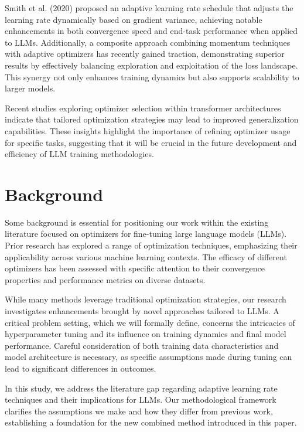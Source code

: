 \documentclass{article} %
\begin{document}
Smith et al. (2020) proposed an adaptive learning rate schedule that adjusts the learning rate dynamically based on gradient variance, achieving notable enhancements in both convergence speed and end-task performance when applied to LLMs. Additionally, a composite approach combining momentum techniques with adaptive optimizers has recently gained traction, demonstrating superior results by effectively balancing exploration and exploitation of the loss landscape. This synergy not only enhances training dynamics but also supports scalability to larger models.

Recent studies exploring optimizer selection within transformer architectures indicate that tailored optimization strategies may lead to improved generalization capabilities. These insights highlight the importance of refining optimizer usage for specific tasks, suggesting that it will be crucial in the future development and efficiency of LLM training methodologies.

\section{Background}
\label{sec:background}
Some background is essential for positioning our work within the existing literature focused on optimizers for fine-tuning large language models (LLMs). Prior research has explored a range of optimization techniques, emphasizing their applicability across various machine learning contexts. The efficacy of different optimizers has been assessed with specific attention to their convergence properties and performance metrics on diverse datasets.

While many methods leverage traditional optimization strategies, our research investigates enhancements brought by novel approaches tailored to LLMs. A critical problem setting, which we will formally define, concerns the intricacies of hyperparameter tuning and its influence on training dynamics and final model performance. Careful consideration of both training data characteristics and model architecture is necessary, as specific assumptions made during tuning can lead to significant differences in outcomes.

In this study, we address the literature gap regarding adaptive learning rate techniques and their implications for LLMs. Our methodological framework clarifies the assumptions we make and how they differ from previous work, establishing a foundation for the new combined method introduced in this paper.
\end{document}
